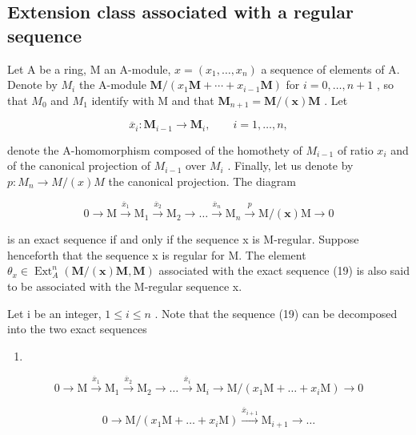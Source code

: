 \subsection{Extension class associated with a regular sequence}

Let A be a ring, M an A-module, \(x = (x_{1}, \ldots, x_{n})\) a sequence of elements of A. Denote by \(M_{i}\) the A-module \(\mathbf{M}/(x_{1}\mathbf{M} + \cdots + x_{i-1}\mathbf{M})\) for \(i = 0, \ldots, n + 1\) , so that \(M_{0}\) and \(M_{1}\) identify with M and that \(\mathbf{M}_{n+1} = \mathbf{M}/(\mathbf{x})\mathbf{M}\) . Let

\[
\overline {{x}} _ {i}: \mathbf {M} _ {i - 1} \to \mathbf {M} _ {i}, \qquad i = 1, \dots , n,
\]

denote the A-homomorphism composed of the homothety of \(M_{i-1}\) of ratio \(x_{i}\) and of the canonical projection of \(M_{i-1}\) over \(M_{i}\) . Finally, let us denote by \(p: M_{n} \to M/(x)M\) the canonical projection. The diagram

\[
0 \longrightarrow \mathrm{M} \xrightarrow {\overline {{{x}}} _ {1}} \mathrm{M} _ {1} \xrightarrow {\overline {{{x}}} _ {2}} \mathrm{M} _ {2} \longrightarrow \dots \xrightarrow {\overline {{{x}}} _ {n}} \mathrm{M} _ {n} \xrightarrow {p} \mathrm{M} / (\boldsymbol {x}) \mathrm{M} \longrightarrow 0\tag{19}
\]

is an exact sequence if and only if the sequence x is M-regular. Suppose henceforth that the sequence x is regular for M. The element \(\theta_{x} \in \operatorname{Ext}_{A}^{n}(\mathbf{M}/(\mathbf{x})\mathbf{M}, \mathbf{M})\) associated with the exact sequence (19) is also said to be associated with the M-regular sequence x.

Let i be an integer, \(1 \leqslant i \leqslant n\) . Note that the sequence (19) can be decomposed into the two exact sequences

\begin{enumerate}
\def\labelenumi{(\arabic{enumi})}
\setcounter{enumi}{19}
\tightlist
\item
\end{enumerate}

\[
0 \longrightarrow \mathrm{M} \xrightarrow {\overline {{x}} _ {1}} \mathrm{M} _ {1} \xrightarrow {\overline {{x}} _ {2}} \mathrm{M} _ {2} \longrightarrow \dots \xrightarrow {\overline {{x}} _ {i}} \mathrm{M} _ {i} \longrightarrow \mathrm{M} / (x _ {1} \mathrm{M} + \dots + x _ {i} \mathrm{M}) \longrightarrow 0\tag{21}
\]

\[
0 \longrightarrow \mathrm{M} / (x _ {1} \mathrm{M} + \dots + x _ {i} \mathrm{M}) \xrightarrow {\overline {{x}} _ {i + 1}} \mathrm{M} _ {i + 1} \longrightarrow \dots
\]

